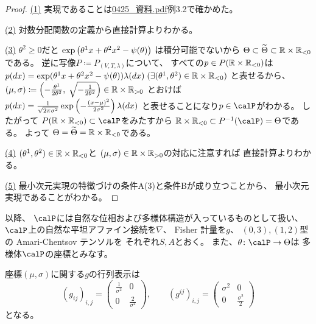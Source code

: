 \documentclass[report]{jlreq}
\begin{document}
\begin{proof}
    \uline{(1)} \quad
    実現であることは\url{0425_資料.pdf}例3.2で確かめた。

    \uline{(2)} \quad
    対数分配関数の定義から直接計算よりわかる。

    \uline{(3)} \quad
    $\theta^2 \ge 0$だと
    $\exp\left({
        \theta^1 x
        + \theta^2 x^2
        - \psi(\theta)
    }\right)$
    は積分可能でないから
    $\Theta \subset \widetilde{\Theta} \subset \mathbb{R} \times \mathbb{R}_{< 0}$
    である。
    逆に写像$P \coloneqq P_{(V, T, \lambda)}$について、
    すべての$p \in P(\mathbb{R} \times \mathbb{R}_{< 0})$は
    $p(dx) = \exp(
        \theta^1 x
        + \theta^2 x^2
        - \psi(\theta)
    ) \lambda(dx)
        \; (\exists (\theta^1, \theta^2) \in \mathbb{R} \times \mathbb{R}_{< 0})$
    と表せるから、
    $(\mu, \sigma) \coloneqq \left({
        - \frac{\theta^1}{2\theta^2}, \;
        \sqrt{- \frac{1}{2\theta^2}}
    }\right) \in \mathbb{R} \times \mathbb{R}_{> 0}$
    とおけば
    $p(dx) = \frac{1}{\sqrt{2 \pi \sigma^2}}
        \exp\left({
            - \frac{(x - \mu)^2}{2 \sigma^2}
        }\right) \lambda(dx)$
    と表せることになり$p \in \calP$がわかる。
    したがって
    $P(\R \times \R_{< 0}) \subset \calP$をみたすから
    $\R \times \R_{< 0} \subset P^{-1}(\calP) =  \Theta$である。
    よって
    $\Theta = \widetilde{\Theta} = \mathbb{R} \times \mathbb{R}_{< 0}$である。

    \uline{(4)} \quad
    $(\theta^1, \theta^2) \in \mathbb{R} \times \mathbb{R}_{< 0}$と
    $(\mu, \sigma) \in \mathbb{R} \times \mathbb{R}_{> 0}$の対応に注意すれば
    直接計算よりわかる。

    \uline{(5)} \quad
    最小次元実現の特徴づけの条件A(3)と条件Bが成り立つことから、
    最小次元実現であることがわかる。
\end{proof}

以降、
$\calP$には自然な位相および多様体構造が入っているものとして扱い、
$\calP$上の自然な平坦アファイン接続を$\nabla$、
Fisher 計量を$g$、
$(0, 3), (1, 2)$型の Amari-Chentsov テンソルを
それぞれ$S, A$とおく。
また、$\theta \colon \calP \to \Theta$は
多様体$\calP$の座標とみなす。

\begin{proposition}
    座標$(\mu, \sigma)$に関する$g$の行列表示は
    \begin{equation}
        (g_{ij})_{i, j}
            = \begin{pmatrix}
                \frac{1}{\sigma^2} & 0 \\
                0 & \frac{2}{\sigma^2}
            \end{pmatrix},
            \qquad
        (g^{ij})_{i, j}
            = \begin{pmatrix}
                \sigma^2 & 0 \\
                0 & \frac{\sigma^2}{2}
            \end{pmatrix}
    \end{equation}
    となる。
\end{proposition}
\end{document}
